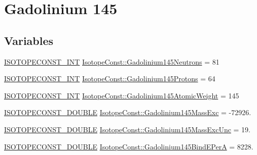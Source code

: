 \hypertarget{group___isotope_const-_gadolinium-_gd145}{}\section{Gadolinium 145}
\label{group___isotope_const-_gadolinium-_gd145}
\subsection*{Variables}
\begin{DoxyCompactItemize}
\item 
\mbox{\hyperlink{group___isotope_const-_macros_ga5f18360b3e99483a35c32d789e62621c}{I\+S\+O\+T\+O\+P\+E\+C\+O\+N\+S\+T\+\_\+\+I\+NT}} \mbox{\hyperlink{group___isotope_const-_gadolinium-_gd145_ga7203ae52f03f0ca1222a823f6eb887d5}{Isotope\+Const\+::\+Gadolinium145\+Neutrons}} = 81
\item 
\mbox{\hyperlink{group___isotope_const-_macros_ga5f18360b3e99483a35c32d789e62621c}{I\+S\+O\+T\+O\+P\+E\+C\+O\+N\+S\+T\+\_\+\+I\+NT}} \mbox{\hyperlink{group___isotope_const-_gadolinium-_gd145_ga0ea9c3480d31c8ebfca9e98ad9faa0fe}{Isotope\+Const\+::\+Gadolinium145\+Protons}} = 64
\item 
\mbox{\hyperlink{group___isotope_const-_macros_ga5f18360b3e99483a35c32d789e62621c}{I\+S\+O\+T\+O\+P\+E\+C\+O\+N\+S\+T\+\_\+\+I\+NT}} \mbox{\hyperlink{group___isotope_const-_gadolinium-_gd145_ga0388a2d6dc9e48e82439a19c601d1786}{Isotope\+Const\+::\+Gadolinium145\+Atomic\+Weight}} = 145
\item 
\mbox{\hyperlink{group___isotope_const-_macros_ga8f45a7272ce02c0b4c65c44636ed719a}{I\+S\+O\+T\+O\+P\+E\+C\+O\+N\+S\+T\+\_\+\+D\+O\+U\+B\+LE}} \mbox{\hyperlink{group___isotope_const-_gadolinium-_gd145_gaeb56edd93a2271f0e81c4d6e9f40ceb8}{Isotope\+Const\+::\+Gadolinium145\+Mass\+Exc}} = -\/72926.
\item 
\mbox{\hyperlink{group___isotope_const-_macros_ga8f45a7272ce02c0b4c65c44636ed719a}{I\+S\+O\+T\+O\+P\+E\+C\+O\+N\+S\+T\+\_\+\+D\+O\+U\+B\+LE}} \mbox{\hyperlink{group___isotope_const-_gadolinium-_gd145_ga1a4c9355b50be6651ff760c147f2fe98}{Isotope\+Const\+::\+Gadolinium145\+Mass\+Exc\+Unc}} = 19.
\item 
\mbox{\hyperlink{group___isotope_const-_macros_ga8f45a7272ce02c0b4c65c44636ed719a}{I\+S\+O\+T\+O\+P\+E\+C\+O\+N\+S\+T\+\_\+\+D\+O\+U\+B\+LE}} \mbox{\hyperlink{group___isotope_const-_gadolinium-_gd145_ga05230683b6f563109659f189d54a9017}{Isotope\+Const\+::\+Gadolinium145\+Bind\+E\+PerA}} = 8228.

\end{DoxyCompactItemize}
